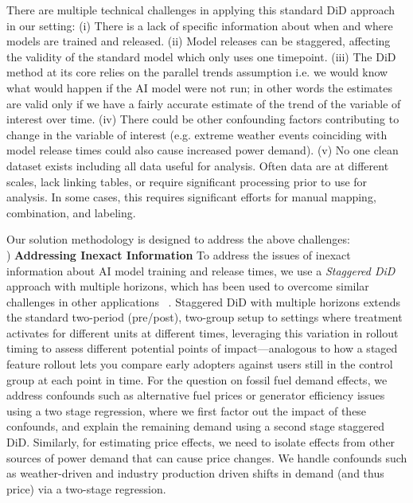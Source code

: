 \documentclass[sigconf]{acmart}
\newcommand{\nb}[1]{\textcolor{blue}{NB[#1]}}
\newcommand{\aruna}[1]{\textcolor{blue}{Aruna[#1]}}
\begin{document}
There are multiple technical challenges in applying this standard DiD approach in our setting: (i) There is a lack of specific information about when and where models are trained and released. (ii) Model releases can be staggered, affecting the validity of the standard model which only uses one timepoint. (iii) The DiD method at its core relies on the parallel trends assumption i.e. we would know what would happen if the AI model were not run; in other words the estimates are valid only if we have a fairly accurate estimate of the trend of the variable of interest over time. (iv) There could be other confounding factors contributing to change in the variable of interest (e.g. extreme weather events coinciding with model release times could also cause increased power demand). (v) No one clean dataset exists including all data useful for analysis. Often data are at different scales, lack linking tables, or require significant processing prior to use for analysis. In some cases, this requires significant efforts for manual mapping, combination, and labeling.

Our solution methodology is designed to address the above challenges:\\
) \textbf{Addressing Inexact Information} To address the issues of inexact information about AI model training and release times, we use a \textit{Staggered DiD} approach with multiple horizons, which has been used to overcome similar challenges in other applications ~\cite{cengiz2019effect, deshpande2019screened}. Staggered DiD with multiple horizons extends the standard two-period (pre/post), two-group setup to settings where treatment activates for different units at different times, leveraging this variation in rollout timing to assess different potential points of impact—analogous to how a staged feature rollout lets you compare early adopters against users still in the control group at each point in time.
For the question on fossil fuel demand effects, we address confounds such as alternative fuel prices or generator efficiency issues using a two stage regression, where we first factor out the impact of these confounds, and explain the remaining demand using a second stage staggered DiD. Similarly, for estimating price effects, we need to isolate effects from other sources of power demand that can cause price changes.
We handle confounds such as weather-driven and industry production driven shifts in demand (and thus price) via a two-stage regression. 
\end{document}
